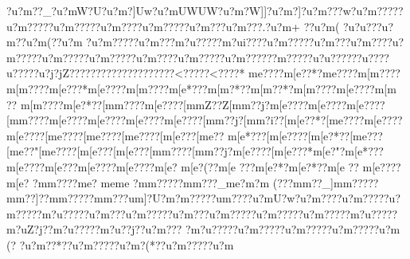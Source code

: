 {{{{{{{{{{{{{{{{{{{{{{{{{{{{{{{{{{{{{{{{{{{{{{{{{{{{{{{{{{{{{{{{{{{{{{{{{{{{{{{{{{{{{{{{{{{{{{{{{{{{{{{{{{{{{{{{{{{{{{{{{{{{{{{{{{{{{{{{{{{{{{{{{{{{{{{{{{{{{{{{{{{{{{{{{{{{{{{{{{{{{{{{{{{{{{{{{{{{{{{{{{{{{{{{{{{{{{{{{{{{{{{{{{{{{{{{{{{{{{{{{{{{{{{{{{{{{{{{{{{{{{{{{{{{{{{{{{{{{{{{{{{{{{{{{{{{{{{{{{{{{{{{{{{{{{{{{{{{{{{{{{{{{{{{{{{{{{{{{{{{{{{{{{{{{{{{{{{{{{{{{{{{{{{{{{{{{{{{{{{{{{{{{{{{{{{{{{{{{{{{{{{{{{{{{{{{{{{{{{{{{{{{{{{{{{{{{{{{{{{{{{{{{{{{{{{{{{{{{{{{{{{{{{{{{{{{{{{{{{{{{{{{{{{{{{{{{{{{{{{{{{{{{{{{{{{{{{{{{{{{{{{{{{{{{{{{{{{{{{{{{{{{{{{{{{{{{{{{{{{{{{{{{{{{{{{{{{{{{{{{{{{{{{{{{{{{{{{{{{{{{{{{{{{{{{{{{{{{{{{{{{{{{{{{{{{{{{{{{{{{{{{{{{{{{{{{{{{{{{{{{{{{{{{{{{{{{{{{{{{{{{{{{{{{{{{{{{{{{{{{{{{{{{{{{{{{{{{{{{{{{{{{{{{{{{{{{{{{{{{{{{{{{{{{{{{{{{{{{{{{{{{{{{{{{{{{{{{{{{{{{{{{{{{{{{{{{{{{{{{{{{{{{{{{{{{{{{{{{{{{{{{{{{{{{{{{{{{{{{{{{{{{{{{{{{{{{{{{{{{{{{{{{{{{{{{{{{{{{{{?u?m??_?u?mW?U?u?m?]Uw?u?mUWUW?u?m?W]]?u?m}?]?u?m???w?u?m?????u?m?????u?m?????u?m????u?m?????u?m???u?m???.?u?m+
 ??u?m(   ?u?u???u?m?  ?u?m(  ??u?m    ?u?m?????u?m???m?u?????m?ui????u?m?????u?m???u?m????u?m?????u?m?????u?m?????u?m????u?m?????u?m?????}?m?????u?u?????}?u}???}?u?????u?}j?jZ???}??????}???????????<?????<????*
{m{e????{m[e??*?{m{e????{m[m????{m[m????{m[e???*{m[e????{m[m????{m[e*???{m[m?*??{m[m??*?{m[m????{m[e????{m[m
??
{m[m????{m[e?*??[m{m????{m[e????[m{mZ??Z[m{m??j?{m[e????{m[e????{m[e????[m{m????{m[e????{m[e????{m[e????{m[e????[m{m??j?[m{m?i??[m[e??*?[m{e????{m[e????{m[e????[m{e????[m{e????[m{e????[m[e???[m{e??
{m[e*???[m[e????[m[e?*??[m{e???[m{e??" [m{e????[m[e???[m[e???[m{m????[m{m??j?{m[e????[m[e???*{m[e?"?{m[e*???{m[e????{m[e???{m[e????{m[e????{m[e?
{m[e?(??{m[e
???{m[e?*?{m[e?*??{m[e
??
{m[e????{m[e?
?m{m????{m{e ? {m{e   {m{e    ?m{m?????m{m???_{m{e  ? {m?m
(???m{m??_]{m{m?????m{m??]??m{m?????m{m???{u{m]?U?{m?m?????u{m????{u?mU?w?u?m????u?m?????u?m?????m?u?????u?m???u?m?????u?m???u?m?????u?m?????u?m?????m?u?????m?uZ?j??m?u?????m?u??j??u?m???
?m?u?????u?m?????u?m?????u?m?????u?m
(?
?u?m??*??u?m?????u?m?(*??u?m?????u?m
}}}}}}}}}}}}}}}}}}}}}}}}}}}}}}}}}}}}}}}}}}}}}}}}}}}}}}}}}}}}}}}}}}}}}}}}}}}}}}}}}}}}}}}}}}}}}}}}}}}}}}}}}}}}}}}}}}}}}}}}}}}}}}}}}}}}}}}}}}}}}}}}}}}}}}}}}}}}}}}}}}}}}}}}}}}}}}}}}}}}}}}}}}}}}}}}}}}}}}}}}}}}}}}}}}}}}}}}}}}}}}}}}}}}}}}}}}}}}}}}}}}}}}}}}}}}}}}}}}}}}}}}}}}}}}}}}}}}}}}}}}}}}}}}}}}}}}}}}}}}}}}}}}}}}}}}}}}}}}}}}}}}}}}}}}}}}}}}}}}}}}}}}}}}}}}}}}}}}}}}}}}}}}}}}}}}}}}}}}}}}}}}}}}}}}}}}}}}}}}}}}}}}}}}}}}}}}}}}}}}}}}}}}}}}}}}}}}}}}}}}}}}}}}}}}}}}}}}}}}}}}}}}}}}}}}}}}}}}}}}}}}}}}}}}}}}}}}}}}}}}}}}}}}}}}}}}}}}}}}}}}}}}}}}}}}}}}}}}}}}}}}}}}}}}}}}}}}}}}}}}}}}}}}}}}}}}}}}}}}}}}}}}}}}}}}}}}}}}}}}}}}}}}}}}}}}}}}}}}}}}}}}}}}}}}}}}}}}}}}}}}}}}}}}}}}}}}}}}}}}}}}}}}}}}}}}}}}}}}}}}}}}}}}}}}}}}}}}}}}}}}}}}}}}}}}}}}}}}}}}}}}}}}}}}}}}}}}}}}}}}}}}}}}}}}}}}}}}}}}}}}}}}}}}}}}}}}}}}}}}}}}}}}}}}}}}}}}}}}}}}}}}}}}}}}}}}}}}}}}}}}}}}}}}}}}}}}}}}}}}}}}}}}}}}}}}}}}}}}}}}}}}}}}}}}}}}}}}}}}}}}}}}}}}}}}}}}}}}}}}}}}}}}}}}}}}}}}}}}}}}}}}}}}}}}}}}}}}}}}}}}}}}}}}}}}}}}
